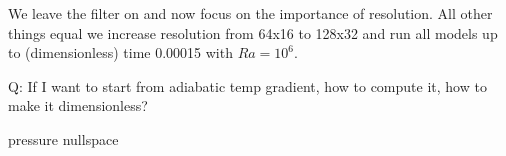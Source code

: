 We leave the filter on and now focus on the importance of resolution. All other things equal we increase
resolution from 64x16 to 128x32 and run all models up to (dimensionless) time 0.00015 with $Ra=10^6$.




 



\vspace{3cm}

Q: If I want to start from adiabatic temp gradient, how to compute it, how to make it dimensionless?

pressure nullspace

